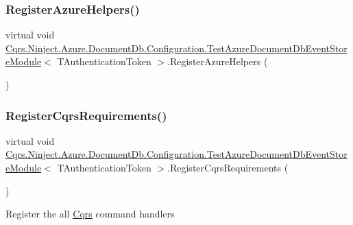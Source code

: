 \subsubsection{\texorpdfstring{Register\+Azure\+Helpers()}{RegisterAzureHelpers()}}
{\footnotesize\ttfamily virtual void \hyperlink{classCqrs_1_1Ninject_1_1Azure_1_1DocumentDb_1_1Configuration_1_1TestAzureDocumentDbEventStoreModule}{Cqrs.\+Ninject.\+Azure.\+Document\+Db.\+Configuration.\+Test\+Azure\+Document\+Db\+Event\+Store\+Module}$<$ T\+Authentication\+Token $>$.Register\+Azure\+Helpers (\begin{DoxyParamCaption}{ }\end{DoxyParamCaption})\hspace{0.3cm}{\ttfamily [virtual]}}

\mbox{\label{classCqrs_1_1Ninject_1_1Azure_1_1DocumentDb_1_1Configuration_1_1TestAzureDocumentDbEventStoreModule_a443538da52dc0bd6943586b1412d7329}} 
\subsubsection{\texorpdfstring{Register\+Cqrs\+Requirements()}{RegisterCqrsRequirements()}}
{\footnotesize\ttfamily virtual void \hyperlink{classCqrs_1_1Ninject_1_1Azure_1_1DocumentDb_1_1Configuration_1_1TestAzureDocumentDbEventStoreModule}{Cqrs.\+Ninject.\+Azure.\+Document\+Db.\+Configuration.\+Test\+Azure\+Document\+Db\+Event\+Store\+Module}$<$ T\+Authentication\+Token $>$.Register\+Cqrs\+Requirements (\begin{DoxyParamCaption}{ }\end{DoxyParamCaption})\hspace{0.3cm}{\ttfamily [virtual]}}



Register the all \hyperlink{namespaceCqrs}{Cqrs} command handlers 

